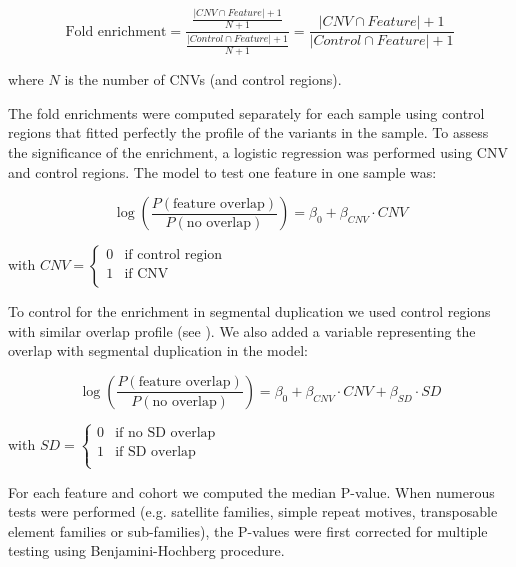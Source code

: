 \begin{equation}
  \label{eq:foldenr}
  \mbox{Fold enrichment} = \frac{\frac{|CNV \cap Feature|+1}{N+1}}{\frac{|Control \cap Feature|+1}{N+1}} = \frac{|CNV \cap Feature|+1}{|Control \cap Feature|+1} 
\end{equation}
  
\noindent where $N$ is the number of CNVs (and control regions).

The fold enrichments were computed separately for each sample using control regions that fitted perfectly the profile of the variants in the sample.
To assess the significance of the enrichment, a logistic regression was performed using CNV and control regions.
The model to test one feature in one sample was:

\begin{equation}
  \label{eq:lr}
  \log \left( \frac{P(\mbox{feature overlap})}{P(\mbox{no overlap})} \right) = \beta_0 + \beta_{CNV} \cdot CNV
\end{equation}


\noindent with $ CNV = \left\{ \begin{array}{ll} 0 & \mbox{if control region} \\ 1 & \mbox{if CNV} \\ \end{array} \right. $

\medskip

To control for the enrichment in segmental duplication we used control regions with similar overlap profile (see ).
We also added a variable representing the overlap with segmental duplication in the model:

\begin{equation}
  \label{eq:lrsd}
  \log \left( \frac{P(\mbox{feature overlap})}{P(\mbox{no overlap})} \right) = \beta_0 + \beta_{CNV} \cdot CNV + \beta_{SD} \cdot SD
\end{equation}


\noindent with $ SD = \left\{ \begin{array}{ll} 0 & \mbox{if no SD overlap} \\ 1 & \mbox{if SD overlap} \\ \end{array} \right. $

For each feature and cohort we computed the median P-value.
When numerous tests were performed (e.g. satellite families, simple repeat motives, transposable element families or sub-families), the P-values were first corrected for multiple testing using Benjamini-Hochberg procedure.

